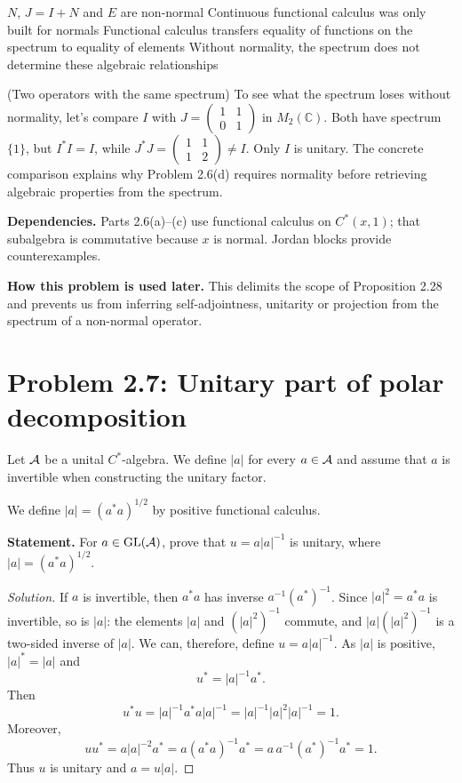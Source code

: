 \proofdiagram
{$N$, $J=I+N$ and $E$ are non-normal}
{Continuous functional calculus was only built for normals}
{Functional calculus transfers equality of functions on the spectrum to equality of elements}
{Without normality, the spectrum does not determine these algebraic relationships}

\begin{cthejemplo}{(Two operators with the same spectrum)}
To see what the spectrum loses without normality, let's compare $I$ with
$J=\begin{pmatrix}1&1\\0&1\end{pmatrix}$ in $M_2(\mathbb C)$.
Both have spectrum $\{1\}$, but $I^*I=I$, while
$J^*J=\begin{pmatrix}1&1\\1&2\end{pmatrix}\ne I$.
Only $I$ is unitary. The concrete comparison explains why Problem 2.6(d) requires normality
before retrieving algebraic properties from the spectrum.
\end{cthejemplo}

\noindent\textbf{Dependencies.} Parts 2.6(a)--(c) use functional calculus on $C^*(x,1)$; that subalgebra is commutative because $x$ is normal. Jordan blocks provide counterexamples.

\noindent\textbf{How this problem is used later.} This delimits the scope of Proposition 2.28 and prevents us from inferring self-adjointness, unitarity or projection from the spectrum of a non-normal operator.

\pagebreak
\section{Problem 2.7: Unitary part of polar decomposition}

Let $\mathcal A$ be a unital $C^*$-algebra. We define $|a|$ for every $a\in\mathcal A$ and assume that $a$ is
invertible when constructing the unitary factor.


We define $|a|=(a^*a)^{1/2}$ by positive functional calculus.

\noindent\textbf{Statement.} For $a\in\operatorname{GL}(\mathcal A)$, prove that $u=a|a|^{-1}$ is unitary, where $|a|=(a^*a)^{1/2}$.

\begin{proof}[Solution]
If $a$ is invertible, then $a^*a$ has inverse $a^{-1}(a^*)^{-1}$.
Since $|a|^2=a^*a$ is invertible, so is $|a|$: the elements $|a|$ and
$(|a|^2)^{-1}$ commute, and $|a|(|a|^2)^{-1}$ is a two-sided inverse of $|a|$.
We can, therefore, define $u=a|a|^{-1}$.
As $|a|$ is positive, $|a|^*=|a|$ and
\[
 u^*=|a|^{-1}a^*.
\]
Then
\[
 u^*u=|a|^{-1}a^*a|a|^{-1}
 =|a|^{-1}|a|^2|a|^{-1}=1.
\]
Moreover,
\[
 uu^*=a|a|^{-2}a^*
 =a(a^*a)^{-1}a^*
 =a\,a^{-1}(a^*)^{-1}a^*=1.
\]
Thus $u$ is unitary and $a=u|a|$.
\end{proof}

